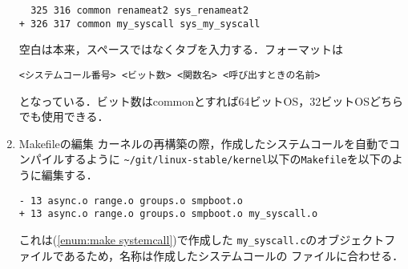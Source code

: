 \documentclass[12pt]{jsarticle}
\begin{document}
\begin{enumerate}
\begin{verbatim}
  325 316 common renameat2 sys_renameat2
+ 326 317 common my_syscall sys_my_syscall
\end{verbatim}

\noindent
空白は本来，スペースではなくタブを入力する．フォーマットは

\begin{verbatim}
<システムコール番号> <ビット数> <関数名> <呼び出すときの名前>
\end{verbatim}

\noindent
となっている．ビット数はcommonとすれば64ビットOS，32ビットOSどちらでも使用できる．

\item Makefileの編集 \label{enum:edit Makefile}
カーネルの再構築の際，作成したシステムコールを自動でコンパイルするように
\verb|~/git/linux-stable/kernel|以下の\verb|Makefile|を以下のように編集する．
\begin{verbatim}
- 13 async.o range.o groups.o smpboot.o
+ 13 async.o range.o groups.o smpboot.o my_syscall.o
\end{verbatim}

これは(\ref{enum:make systemcall})で作成した
\verb|my_syscall.c|のオブジェクトファイルであるため，名称は作成したシステムコールの
ファイルに合わせる．
\end{enumerate}
\end{document}
